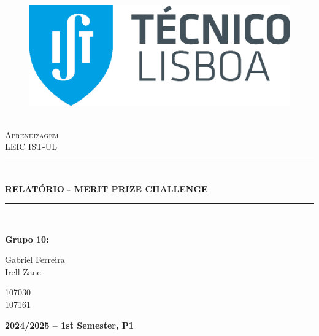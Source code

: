 \documentclass{article}
\newcommand{\HRule}[1]{\rule{\linewidth}{#1}}
\begin{document}
\begin{center}
  \begin{figure}
    \includegraphics[scale = 0.3, left]{img/IST_A.eps} %
    \end{figure}
  \LARGE{ \normalsize \textsc{} \\
  [2.0cm] 
  \LARGE{ \LARGE \textsc{Aprendizagem}} \\
  [1cm]
  \LARGE{ \LARGE \textsc{LEIC IST-UL}} \\
  [1cm]
  \HRule{1.5pt} \\
  [0.4cm]
  \LARGE \textbf{\uppercase{Relatório - Merit Prize Challenge}}
  \HRule{1.5pt}
  \\ [2.5cm]
  }
\end{center}

\begin{flushleft}
  \textbf{\LARGE Grupo 10:}
\end{flushleft}

\begin{center}
  \begin{minipage}{0.7\textwidth}
      \begin{flushleft}
        \large Gabriel Ferreira \\
        \large  Irell Zane
      \end{flushleft}
  \end{minipage}%
  \begin{minipage}{0.3\textwidth}
      \begin{flushright}
        \large 107030\\
        \large 107161
      \end{flushright}
  \end{minipage}
\end{center}

\begin{center}
  \vspace{4cm}
  \date \large \bf  2024/2025 -- 1st Semester, P1
\end{center}
\end{document}
